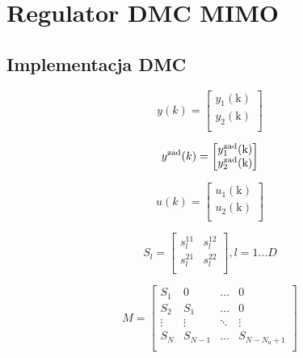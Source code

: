 \chapter{Regulator DMC MIMO}

\section{Implementacja DMC}

\begin{equation}
	y(k) = 
	\begin{bmatrix}
		y_{1}(\textrm{k}) \\
		y_{2}(\textrm{k}) \\
	\end{bmatrix}
\end{equation}

\begin{equation}
	y^{\text{\textrm{zad}}}(k) = 
	\begin{bmatrix}
		y_{1}^{\textrm{zad}}(\textrm{k}) \\
		y_{2}^{\textrm{zad}}(\textrm{k}) \\
	\end{bmatrix}
\end{equation}

\begin{equation}
	u(k) = 
	\begin{bmatrix}
		u_{1}(\textrm{k}) \\
		u_{2}(\textrm{k}) \\
	\end{bmatrix}
\end{equation}

\begin{equation}
	S_l = 
	\begin{bmatrix}
		s_{l}^{\textrm{11}} & s_{l}^{\textrm{12}} \\
		s_{l}^{\textrm{21}} & s_{l}^{\textrm{22}} \\
	\end{bmatrix}
	,l = 1...D
\end{equation}

\begin{equation}
	M = 
	\begin{bmatrix}
		S_1 & 0 & \hdots & 0 \\
		S_2 & S_1 & \hdots & 0 \\
		\vdots & \vdots &\ddots & \vdots \\
		S_N & S_{N-1} & \hdots & S_{N-N_{\text{u}}+1} \\
	\end{bmatrix}
\end{equation}

